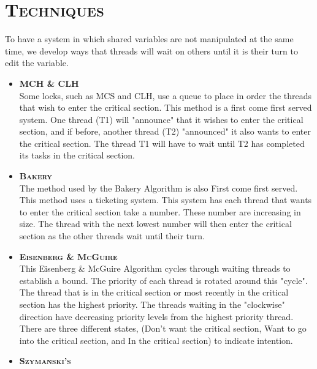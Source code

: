 \documentclass[FinalReport.tex]{subfiles}
\begin{document}
\bigskip

\section*{\textsc{\Large Techniques}}

	To have a system in which shared variables are not manipulated at the same time, we develop ways that threads will wait on others until it is their turn to edit the variable.  
	
	\begin{itemize}
		\item \textsc{ \bf MCH \& CLH} \\
			Some locks, such as MCS and CLH, use a queue to place in order the threads that wish to enter the critical section.  This method is a first come first served system.  One thread (T1) will "announce" that it wishes to enter the critical section, and if before, another thread (T2) "announced" it also wants to enter the critical section.  The thread T1 will have to wait until T2 has completed its tasks in the critical section.
			
		\item \textsc{ \bf Bakery}\\
		The method used by the Bakery Algorithm is also First come first served.  This method uses a ticketing system.  This system has each thread that wants to enter the critical section take a number.  These number are increasing in size.  The thread with the next lowest number will then enter the critical section as the other threads wait until their turn.

		\item \textsc{ \bf Eisenberg \& McGuire}\\
		This Eisenberg \& McGuire Algorithm cycles through waiting threads to establish a bound.  The priority of each thread is rotated around this "cycle".  The thread that is in the critical section or most recently in the critical section has the highest priority.  The threads waiting in the "clockwise" direction have decreasing priority levels from the highest priority thread.  There are three different states, (Don't want the critical section, Want to go into the critical section, and In the critical section) to indicate intention. 
		
		\item \textsc{ \bf Szyma\`{n}ski's}\\
		
	\end{itemize}
	
	
	
	
\end{document}
